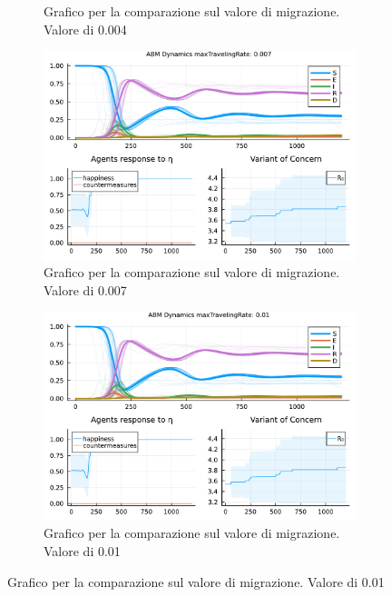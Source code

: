 \begin{figure}[!hb]
\begin{subfigure}[b]{0.45\textwidth}
		\caption{Grafico per la comparazione sul valore di migrazione. Valore di 0.004}
		\label{fig:comparison_maxTravelingRate_midl}
	\end{subfigure}
	\hfill
	\begin{subfigure}[b]{0.45\textwidth}
		\centering
		\includegraphics[width=\textwidth]{img/SocialNetworkABM_3_MTR.pdf}
		\caption{Grafico per la comparazione sul valore di migrazione. Valore di 0.007}
		\label{fig:comparison_maxTravelingRate_midh}
	\end{subfigure}
	\hfill
	\begin{subfigure}[b]{0.45\textwidth}
		\centering
		\includegraphics[width=\textwidth]{img/SocialNetworkABM_4_MTR.pdf}
		\caption{Grafico per la comparazione sul valore di migrazione. Valore di 0.01}
		\label{fig:comparison_maxTravelingRate_high}
	\end{subfigure}
\end{figure}
\newpage

